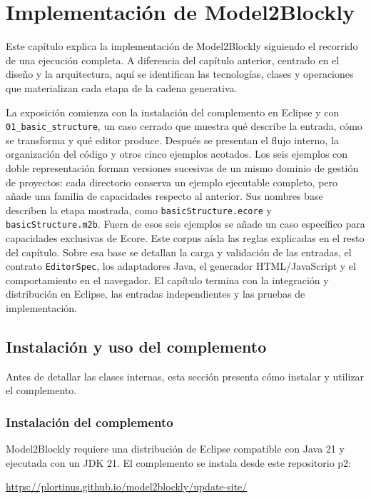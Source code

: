 \chapter{Implementación de Model2Blockly}
\label{chap:implementacion}

Este capítulo explica la implementación de Model2Blockly siguiendo el recorrido
de una ejecución completa. A diferencia del capítulo anterior, centrado en el
diseño y la arquitectura, aquí se identifican las tecnologías, clases y
operaciones que materializan cada etapa de la cadena generativa.

La exposición comienza con la instalación del complemento en Eclipse y con
\texttt{01\_basic\_structure}, un caso cerrado que muestra qué describe la
entrada, cómo se transforma y qué editor produce. Después se presentan el flujo
interno, la organización del código y otros cinco ejemplos acotados. Los seis
ejemplos con doble representación forman versiones sucesivas de un mismo
dominio de gestión de proyectos:
cada directorio conserva un ejemplo ejecutable completo, pero añade una familia
de capacidades respecto al anterior. Sus nombres base describen la etapa
mostrada, como \texttt{basicStructure.ecore} y
\texttt{basicStructure.m2b}. Fuera de esos seis ejemplos se añade un caso específico para
capacidades exclusivas de Ecore. Este corpus aísla las reglas explicadas en el
resto del capítulo. Sobre esa base se detallan la carga y validación de las
entradas, el contrato \texttt{EditorSpec}, los
adaptadores Java, el generador HTML/JavaScript y el comportamiento en el
navegador. El capítulo termina con la integración y distribución en Eclipse,
las entradas independientes y las pruebas de implementación.

\section{Instalación y uso del complemento}
\label{sec:ejecucion-model2blockly}

Antes de detallar las clases internas, esta sección presenta cómo instalar y
utilizar el complemento.

\subsection{Instalación del complemento}

\begin{samepage}
Model2Blockly requiere una distribución de Eclipse compatible con Java 21 y
ejecutada con un JDK 21. El complemento se instala desde este repositorio p2:

\begin{center}
  \url{https://plortinus.github.io/model2blockly/update-site/}
\end{center}
\end{samepage}


